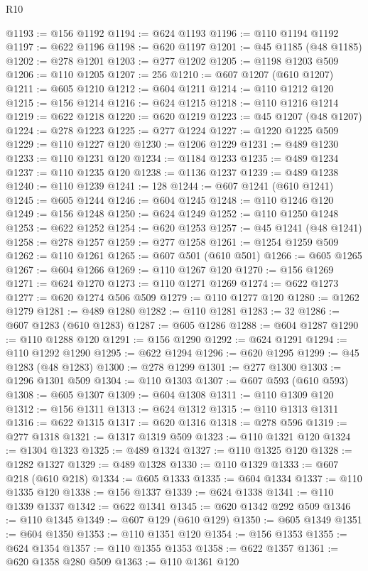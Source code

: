 \begin{lexlean}{R10}
\begin{coremodule}
@1193 := @156 @1192
@1194 := @624 @1193
@1196 := @110 @1194 @1192
@1197 := @622 @1196
@1198 := @620 @1197
@1201 := @45 @1185 (@48 @1185)
@1202 := @278 @1201
@1203 := @277 @1202
@1205 := @1198 @1203 @509
@1206 := @110 @1205
@1207 := 256
@1210 := @607 @1207 (@610 @1207)
@1211 := @605 @1210
@1212 := @604 @1211
@1214 := @110 @1212 @120
@1215 := @156 @1214
@1216 := @624 @1215
@1218 := @110 @1216 @1214
@1219 := @622 @1218
@1220 := @620 @1219
@1223 := @45 @1207 (@48 @1207)
@1224 := @278 @1223
@1225 := @277 @1224
@1227 := @1220 @1225 @509
@1229 := @110 @1227 @120
@1230 := @1206 @1229
@1231 := @489 @1230
@1233 := @110 @1231 @120
@1234 := @1184 @1233
@1235 := @489 @1234
@1237 := @110 @1235 @120
@1238 := @1136 @1237
@1239 := @489 @1238
@1240 := @110 @1239
@1241 := 128
@1244 := @607 @1241 (@610 @1241)
@1245 := @605 @1244
@1246 := @604 @1245
@1248 := @110 @1246 @120
@1249 := @156 @1248
@1250 := @624 @1249
@1252 := @110 @1250 @1248
@1253 := @622 @1252
@1254 := @620 @1253
@1257 := @45 @1241 (@48 @1241)
@1258 := @278 @1257
@1259 := @277 @1258
@1261 := @1254 @1259 @509
@1262 := @110 @1261
@1265 := @607 @501 (@610 @501)
@1266 := @605 @1265
@1267 := @604 @1266
@1269 := @110 @1267 @120
@1270 := @156 @1269
@1271 := @624 @1270
@1273 := @110 @1271 @1269
@1274 := @622 @1273
@1277 := @620 @1274 @506 @509
@1279 := @110 @1277 @120
@1280 := @1262 @1279
@1281 := @489 @1280
@1282 := @110 @1281
@1283 := 32
@1286 := @607 @1283 (@610 @1283)
@1287 := @605 @1286
@1288 := @604 @1287
@1290 := @110 @1288 @120
@1291 := @156 @1290
@1292 := @624 @1291
@1294 := @110 @1292 @1290
@1295 := @622 @1294
@1296 := @620 @1295
@1299 := @45 @1283 (@48 @1283)
@1300 := @278 @1299
@1301 := @277 @1300
@1303 := @1296 @1301 @509
@1304 := @110 @1303
@1307 := @607 @593 (@610 @593)
@1308 := @605 @1307
@1309 := @604 @1308
@1311 := @110 @1309 @120
@1312 := @156 @1311
@1313 := @624 @1312
@1315 := @110 @1313 @1311
@1316 := @622 @1315
@1317 := @620 @1316
@1318 := @278 @596
@1319 := @277 @1318
@1321 := @1317 @1319 @509
@1323 := @110 @1321 @120
@1324 := @1304 @1323
@1325 := @489 @1324
@1327 := @110 @1325 @120
@1328 := @1282 @1327
@1329 := @489 @1328
@1330 := @110 @1329
@1333 := @607 @218 (@610 @218)
@1334 := @605 @1333
@1335 := @604 @1334
@1337 := @110 @1335 @120
@1338 := @156 @1337
@1339 := @624 @1338
@1341 := @110 @1339 @1337
@1342 := @622 @1341
@1345 := @620 @1342 @292 @509
@1346 := @110 @1345
@1349 := @607 @129 (@610 @129)
@1350 := @605 @1349
@1351 := @604 @1350
@1353 := @110 @1351 @120
@1354 := @156 @1353
@1355 := @624 @1354
@1357 := @110 @1355 @1353
@1358 := @622 @1357
@1361 := @620 @1358 @280 @509
@1363 := @110 @1361 @120

\end{coremodule}
\end{lexlean}
